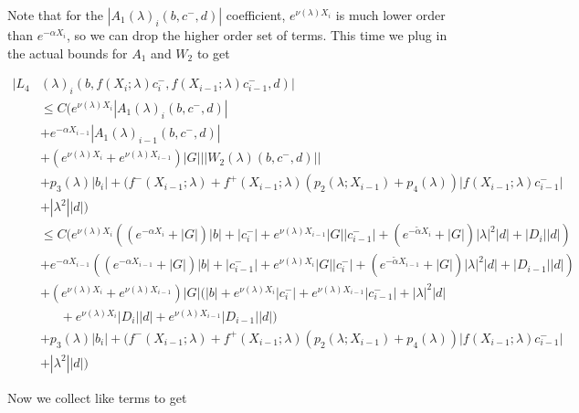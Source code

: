 \documentclass[12pt]{article}
\begin{document}
\begin{enumerate}
Note that for the $|A_1(\lambda)_i(b, c^-, d)|$ coefficient, $e^{\nu(\lambda)X_{i}}$ is much lower order than $e^{-\alpha X_i}$, so we can drop the higher order set of terms. This time we plug in the actual bounds for $A_1$ and $W_2$ to get

\begin{align*}
|L_4&(\lambda)_i(b, f(X_i; \lambda) c_i^-, f(X_{i-1}; \lambda) c_{i-1}^-, d)|\\ 
&\leq C\Big( e^{\nu(\lambda)X_{i}} |A_1(\lambda)_i(b, c^-, d)| \\
&+  e^{-\alpha X_{i-1}} |A_1(\lambda)_{i-1}(b, c^-, d)| \\
&+ (e^{\nu(\lambda)X_i} + e^{\nu(\lambda)X_{i-1}}) |G| ||W_2(\lambda)(b,c^-,d)|| \\
&+ p_3(\lambda) |b_i| + (f^-(X_{i-1}; \lambda) + f^+(X_{i-1}; \lambda) (p_2(\lambda; X_{i-1}) + p_4(\lambda)) | f(X_{i-1}; \lambda) c_{i-1}^-| \\
&+|\lambda^2| |d|) \\
&\leq C\Big( e^{\nu(\lambda)X_{i}} ((e^{-\alpha X_i} + |G|) |b| 
+ |c_i^-| + e^{\nu(\lambda)X_{i-1}} |G||c_{i-1}^-| + (e^{-\tilde{\alpha} X_i} + |G|) |\lambda|^2 |d| + |D_i||d|)\\
&+  e^{-\alpha X_{i-1}} ((e^{-\alpha X_{i-1}} + |G|) |b| 
+ |c_{i-1}^-| + e^{\nu(\lambda)X_i} |G||c_i^-| + (e^{-\tilde{\alpha} X_{i-1}} + |G|) |\lambda|^2 |d| + |D_{i-1}||d|) \\
&+ (e^{\nu(\lambda)X_i} + e^{\nu(\lambda)X_{i-1}}) |G| ( |b| + e^{\nu(\lambda) X_i} |c_i^-| +  e^{\nu(\lambda) X_{i-1}} |c_{i-1}^-| + |\lambda|^2 |d| \\
&\:\:\:\:\:\:\:+ e^{\nu(\lambda) X_i} |D_i| |d| + e^{\nu(\lambda) X_{i-1}} |D_{i-1}| |d| ) \\
&+ p_3(\lambda) |b_i| + (f^-(X_{i-1}; \lambda) + f^+(X_{i-1}; \lambda) (p_2(\lambda; X_{i-1}) + p_4(\lambda)) | f(X_{i-1}; \lambda) c_{i-1}^-| \\
&+|\lambda^2| |d|)
\end{align*}

Now we collect like terms to get


\end{enumerate}
\end{document}
